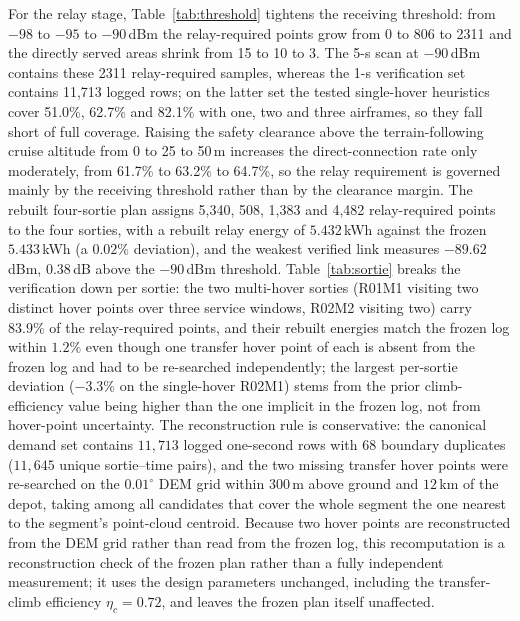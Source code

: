 \documentclass[journal]{IEEEtran}
\begin{document}
For the relay stage, Table~\ref{tab:threshold} tightens the receiving
threshold: from $-98$ to $-95$ to $-90$\,dBm the relay-required points grow
from 0 to 806 to 2311 and the directly served areas shrink from 15 to 10 to 3.
The 5-s scan at $-90$\,dBm contains these 2311 relay-required samples, whereas
the 1-s verification set contains 11,713 logged rows; on the latter set the
tested single-hover heuristics cover 51.0\%, 62.7\% and 82.1\% with one, two
and three airframes, so they fall short of full coverage. Raising the safety
clearance above the terrain-following cruise altitude from 0 to 25 to 50\,m
increases the direct-connection rate only moderately, from 61.7\% to 63.2\% to
64.7\%, so the relay requirement is governed mainly by the receiving threshold
rather than by the clearance margin. The rebuilt four-sortie plan
assigns 5,340, 508, 1,383 and 4,482 relay-required points to the four sorties,
with a rebuilt relay energy of $5.432$\,kWh against the frozen $5.433$\,kWh (a
$0.02\%$ deviation), and the weakest verified link measures $-89.62$\,dBm,
$0.38$\,dB above the $-90$\,dBm threshold. Table~\ref{tab:sortie} breaks the
verification down per sortie: the two multi-hover sorties (R01M1 visiting two
distinct hover points over three service windows, R02M2 visiting two) carry
$83.9\%$ of the relay-required points, and their rebuilt energies match the
frozen log within $1.2\%$ even though one transfer hover point of each is
absent from the frozen log and had to be re-searched independently; the
largest per-sortie deviation ($-3.3\%$ on the single-hover R02M1) stems from
the prior climb-efficiency value being higher than the one implicit in the
frozen log, not from hover-point uncertainty. The reconstruction
rule is conservative: the canonical demand set contains $11{,}713$ logged
one-second rows with $68$ boundary duplicates ($11{,}645$ unique
sortie--time pairs), and
the two missing transfer hover points were re-searched on the $0.01^\circ$ DEM
grid within $300$\,m above ground and $12$\,km of the depot, taking among all
candidates that cover the whole segment the one nearest to the segment's
point-cloud centroid. Because two hover points are reconstructed from the DEM
grid rather than read from the frozen log, this recomputation is a reconstruction
check of the frozen plan rather than a fully independent measurement; it uses the
design parameters unchanged, including the transfer-climb efficiency
$\eta_c=0.72$, and leaves the frozen plan itself unaffected.
\end{document}
